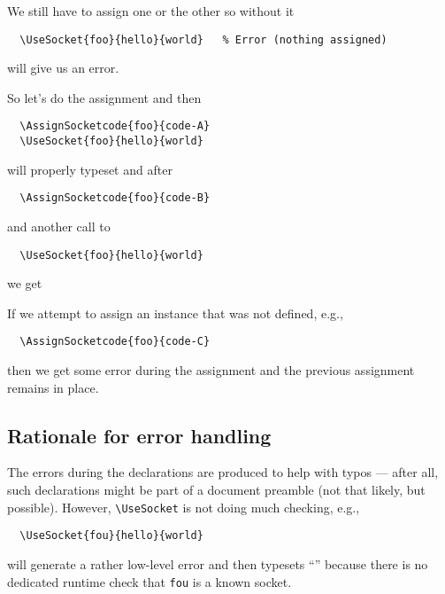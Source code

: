 \documentclass{article}
\newcommand\cs[1]{\texttt{\textbackslash #1}}
\begin{document}

We still have to assign one or the other so without it
\begin{verbatim}
  \UseSocket{foo}{hello}{world}   % Error (nothing assigned)
\end{verbatim}
will give us an error.


So let's do the assignment and then
\begin{verbatim}
  \AssignSocketcode{foo}{code-A}
  \UseSocket{foo}{hello}{world}
\end{verbatim}
will properly typeset
and after
\begin{verbatim}
  \AssignSocketcode{foo}{code-B}
\end{verbatim}
and another call to
\begin{verbatim}
  \UseSocket{foo}{hello}{world}
\end{verbatim}
we get

If we attempt to assign an instance that was not defined, e.g.,
\begin{verbatim}
  \AssignSocketcode{foo}{code-C}
\end{verbatim}
then we get some error during the assignment and the previous assignment remains in place.


\subsection{Rationale for error handling}

The errors during the declarations are produced to help
with typos --- after all, such declarations might be part of a document
preamble (not that likely, but possible). However, \cs{UseSocket} is not doing much checking, e.g.,
\begin{verbatim}
  \UseSocket{fou}{hello}{world}
\end{verbatim}
will generate a rather low-level error and then typesets
%
``''
%
because there is no dedicated runtime check that \texttt{fou} is a known socket.
\end{document}

